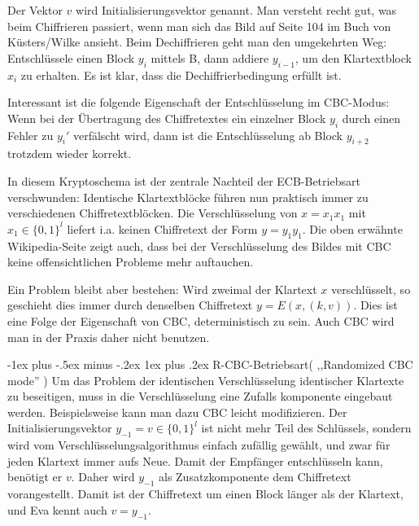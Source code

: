 \documentclass[a4paper]{article}
\makeatletter
\renewcommand{\subsubsection}{\@startsection{subsubsection}{3}{0mm}%
 {-1ex plus -.5ex minus -.2ex}%
 {1ex plus .2ex}%
 {\normalfont\small\bfseries}}
\makeatother
\begin{document}
\begin{multicols}{3}
    Der Vektor $v$ wird Initialisierungsvektor genannt. Man versteht recht gut, was beim Chiffrieren passiert, wenn man sich das Bild auf Seite 104 im Buch von Küsters/Wilke ansieht. Beim Dechiffrieren geht man den umgekehrten Weg: Entschlüssele einen Block $y_i$ mittels B, dann addiere $y_{i-1}$, um den Klartextblock $x_i$ zu erhalten. Es ist klar, dass die Dechiffrierbedingung erfüllt ist.

    Interessant ist die folgende Eigenschaft der Entschlüsselung im CBC-Modus: Wenn bei der Übertragung des Chiffretextes ein einzelner Block $y_i$ durch einen Fehler zu $y_i'$ verfälscht wird, dann ist die Entschlüsselung ab Block $y_{i+2}$ trotzdem wieder korrekt.

    In diesem Kryptoschema ist der zentrale Nachteil der ECB-Betriebsart verschwunden: Identische Klartextblöcke führen nun praktisch immer zu verschiedenen Chiffretextblöcken. Die Verschlüsselung von $x=x_1 x_1$ mit $x_1\in\{0,1\}^l$ liefert i.a. keinen Chiffretext der Form $y=y_1 y_1$. Die oben erwähnte Wikipedia-Seite zeigt auch, dass bei der Verschlüsselung des Bildes mit CBC keine offensichtlichen Probleme mehr auftauchen.

    Ein Problem bleibt aber bestehen: Wird zweimal der Klartext $x$ verschlüsselt, so geschieht dies immer durch denselben Chiffretext $y=E(x,(k,v))$. Dies ist eine Folge der Eigenschaft von CBC, deterministisch zu sein. Auch CBC wird man in der Praxis daher nicht benutzen.

    \subsubsection{R-CBC-Betriebsart( ,,Randomized CBC mode'' )}
    Um das Problem der identischen Verschlüsselung identischer Klartexte zu beseitigen, muss in die Verschlüsselung eine Zufalls komponente eingebaut werden. Beispielsweise kann man dazu CBC leicht modifizieren. Der Initialisierungsvektor $y_{-1}=v\in\{0,1\}^l$ ist nicht mehr Teil des Schlüssels, sondern wird vom Verschlüsselungsalgorithmus einfach zufällig gewählt, und zwar für jeden Klartext immer aufs Neue. Damit der Empfänger entschlüsseln kann, benötigt er $v$. Daher wird $y_{-1}$ als Zusatzkomponente dem Chiffretext vorangestellt. Damit ist der Chiffretext um einen Block länger als der Klartext, und Eva kennt auch $v=y_{-1}$.


\end{multicols}
\end{document}
